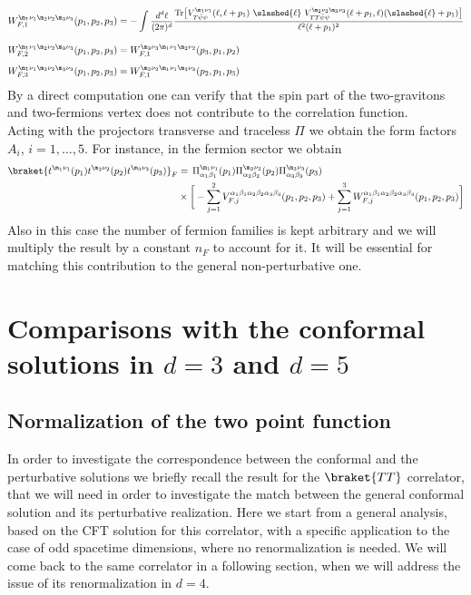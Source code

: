 \documentclass[a4paper,11pt,openright,twoside]{book}
\let\a=\alpha   \let\b=\beta   \let\g=\gamma   \let\d=\delta
\let\n=\nu      \let\x=\xi     \let\p=\pi      \let\r=\rho
\newcommand{\sdfrac}[2]{\mbox{\small$\displaystyle\frac{#1}{#2}$}}
\newcommand{\Tr}{\text{Tr}}
\numberwithin{equation}{section}
\begin{document}
{{\begin{align}
	W_{F,1}^{\m_1\n_1\m_2\n_2\m_3\n_3}(p_1,p_2,p_3)&=-\int \sdfrac{d^d\ell}{(2\pi)^d}\sdfrac{\Tr\big[V^{\m_1\n_1}_{T\bar\psi\psi}(\ell,\ell+p_1)\ \slashed{\ell}\ V^{\m_2\n_2\m_3\n_3}_{TT\bar\psi\psi}(\ell+p_1,\ell)(\slashed{\ell}+p_1)\big]}{\ell^2(\ell+p_1)^2}\\[2ex]
	W_{F,2}^{\m_1\n_1\m_2\n_2\m_3\n_3}(p_1,p_2,p_3)&=W_{F,1}^{\m_3\n_3\m_1\n_1\m_2\n_2}(p_3,p_1,p_2)\\[1ex]
	W_{F,3}^{\m_1\n_1\m_2\n_2\m_3\n_3}(p_1,p_2,p_3)&=W_{F,1}^{\m_2\n_2\m_1\n_1\m_3\n_3}(p_2,p_1,p_3)
\end{align}
By a direct computation one can verify that the spin part of the two-gravitons and two-fermions vertex does not contribute to the correlation function. \\
Acting with the projectors transverse and traceless $\Pi$ we obtain the form factors $A_i$, $i=1,\dots,5$. For instance, in the fermion sector we obtain
\begin{align}
	\braket{t^{\m_1\n_1}(p_1)t^{\m_2\n_2}(p_2)t^{\m_3\n_3}(p_3)}_F&=\,\Pi^{\m_1\n_1}_{\a_1\b_1}(p_1)\Pi^{\m_2\n_2}_{\a_2\b_2}(p_2)\Pi^{\m_3\n_3}_{\a_3\b_3}(p_3)\notag\\
	&\times\bigg[ -\sum_{j=1}^2V_{F,j}^{\a_1\b_1\a_2\b_2\a_3\b_3}(p_1,p_2,p_3)+\sum_{j=1}^3W_{F,j}^{\a_1\b_1\a_2\b_2\a_3\b_3}(p_1,p_2,p_3)\bigg]
\end{align}
Also in this case the number of fermion families is kept arbitrary and we will multiply the result by a constant $n_F$ to account for it. It will be essential for matching this contribution to the general non-perturbative one. 

\section{Comparisons with the conformal solutions in $d=3$ and $d=5$}

\subsection{Normalization of the two point function}
\label{compare}
In order to investigate the correspondence between the conformal and the perturbative solutions 
we briefly recall the result for the $\braket{TT}$ correlator, that we will need in order to investigate the match between the general conformal solution and its perturbative realization. 
Here we start from a general analysis, based on the CFT solution for this correlator, with a specific application to the case of odd spacetime dimensions, where no renormalization is needed. We will come back to the same correlator in a following section, when we will address the issue of its renormalization in $d=4$.

}}
\end{document}
